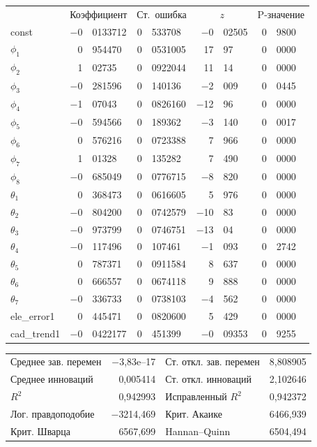\documentclass[a4paper,12pt]{article}
\begin{document}
\begin{table}[H]
\begin{center}
	\begin{tabular}{lr@{,}lr@{,}lr@{,}lr@{,}l}
		&
		\multicolumn{2}{c}{Коэффициент} &
		\multicolumn{2}{c}{Ст.\ ошибка} &
		\multicolumn{2}{c}{$z$} &
		\multicolumn{2}{c}{P-значение} \\[1ex]
		const &
		$-$0&0133712 &
		0&533708 &
		$-$0&02505 &
		0&9800 \\
		$\phi_{1}$ &
		0&954470 &
		0&0531005 &
		17&97 &
		0&0000 \\
		$\phi_{2}$ &
		1&02735 &
		0&0922044 &
		11&14 &
		0&0000 \\
		$\phi_{3}$ &
		$-$0&281596 &
		0&140136 &
		$-$2&009 &
		0&0445 \\
		$\phi_{4}$ &
		$-$1&07043 &
		0&0826160 &
		$-$12&96 &
		0&0000 \\
		$\phi_{5}$ &
		$-$0&594566 &
		0&189362 &
		$-$3&140 &
		0&0017 \\
		$\phi_{6}$ &
		0&576216 &
		0&0723388 &
		7&966 &
		0&0000 \\
		$\phi_{7}$ &
		1&01328 &
		0&135282 &
		7&490 &
		0&0000 \\
		$\phi_{8}$ &
		$-$0&685049 &
		0&0776715 &
		$-$8&820 &
		0&0000 \\
		$\theta_{1}$ &
		0&368473 &
		0&0616605 &
		5&976 &
		0&0000 \\
		$\theta_{2}$ &
		$-$0&804200 &
		0&0742579 &
		$-$10&83 &
		0&0000 \\
		$\theta_{3}$ &
		$-$0&973799 &
		0&0746751 &
		$-$13&04 &
		0&0000 \\
		$\theta_{4}$ &
		$-$0&117496 &
		0&107461 &
		$-$1&093 &
		0&2742 \\
		$\theta_{5}$ &
		0&787371 &
		0&0911584 &
		8&637 &
		0&0000 \\
		$\theta_{6}$ &
		0&666557 &
		0&0674118 &
		9&888 &
		0&0000 \\
		$\theta_{7}$ &
		$-$0&336733 &
		0&0738103 &
		$-$4&562 &
		0&0000 \\
		ele\_error1 &
		0&445471 &
		0&0820600 &
		5&429 &
		0&0000 \\
		cad\_trend1 &
		$-$0&0422177 &
		0&451399 &
		$-$0&09353 &
		0&9255 \\
	\end{tabular}
	
	\vspace{1ex}
	\begin{tabular}{lrlr}
		Среднее зав. перемен & $-$3,83\textrm{e--17} & Ст. откл. зав. перемен &  8,808905 \\
		Среднее инноваций &  0,005414 & Ст. откл. инноваций &  2,102646 \\
		$R^2$ &  0,942993 & Исправленный $R^2$ &  0,942372 \\
		Лог. правдоподобие & $-$3214,469 & Крит. Акаике &  6466,939 \\
		Крит. Шварца &  6567,699 & Hannan--Quinn &  6504,494 \\
	\end{tabular}
	

\end{center}
\end{table}
\end{document}

